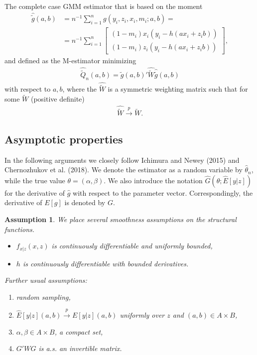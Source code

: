 \documentclass{article}
\newtheorem{assumption}{Assumption}
\theoremstyle{definition}
\theoremstyle{remark}
\begin{document}
The complete case GMM estimator that is based on the moment
\begin{align}
    \hat{\tilde{g}}(a,b)&=n^{-1}\sum_{i=1}^n g(y_i,z_i,x_i, m_i; a,b)= \\
&=n^{-1}\sum_{i=1}^n\left[\begin{array}{c}
(1-m_i) x_i(y_i- h(ax_i+z_i b))  \\
(1-m_i) z_i(y_i- h(ax_i+z_i b))
\end{array}\right], \nonumber %
\end{align}
and defined as the M-estimator minimizing
\begin{align}
\hat{\tilde{Q}}_n(a,b)= \hat{\tilde{g}}(a,b)'\hat{\tilde{W}}\hat{\tilde{g}}(a,b)
\end{align}
with respect to $a,b$, where the $\hat{\tilde{W}}$ is a symmetric weighting matrix such that for some $\tilde{W}$ (positive definite)
\begin{align}
\hat{\tilde{W}} \stackrel{p}{\rightarrow}\tilde{W}.
\end{align}


\subsection{Asymptotic properties}
In the following arguments we closely follow Ichimura and Newey (2015) and Chernozhukov et al. (2018). We denote the estimator as a random variable by $\hat{\theta}_n$, while the true value $\theta= (\alpha,\beta)$. We also introduce the notation $\hat{G}(\theta;\hat{E}[y|z])$ for the derivative of $\hat{g}$ with respect to the parameter vector. Correspondingly, the derivative of $E[g]$ is denoted by $G$.

\begin{assumption}\label{ass_regulatory1}
	We place several smoothness assumptions on the structural functions.
	\begin{itemize}
		\item $f_{x|z}(x,z)$ is continuously differentiable and uniformly bounded,
		\item $h$ is continuously differentiable with bounded derivatives.
	\end{itemize}
	Further usual assumptions:
	\begin{enumerate}
		\item random sampling,
		\item $\hat{E}[y|z](a,b)\stackrel{p}{\rightarrow} E[y|z](a,b)$ uniformly over $z$ and $(a,b) \in A \times B$,
		\item $\alpha,\beta \in A \times B$, a compact set,
		\item $G'WG$ is a.s. an invertible matrix.
	\end{enumerate}
\end{assumption}
\end{document}
